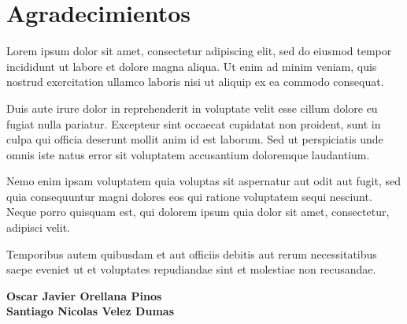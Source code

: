 
\chapter*{Agradecimientos}

\vspace{2cm}

Lorem ipsum dolor sit amet, consectetur adipiscing elit, sed do eiusmod tempor incididunt ut labore et dolore magna aliqua. Ut enim ad minim veniam, quis nostrud exercitation ullamco laboris nisi ut aliquip ex ea commodo consequat.

Duis aute irure dolor in reprehenderit in voluptate velit esse cillum dolore eu fugiat nulla pariatur. Excepteur sint occaecat cupidatat non proident, sunt in culpa qui officia deserunt mollit anim id est laborum. Sed ut perspiciatis unde omnis iste natus error sit voluptatem accusantium doloremque laudantium.

Nemo enim ipsam voluptatem quia voluptas sit aspernatur aut odit aut fugit, sed quia consequuntur magni dolores eos qui ratione voluptatem sequi nesciunt. Neque porro quisquam est, qui dolorem ipsum quia dolor sit amet, consectetur, adipisci velit.

Temporibus autem quibusdam et aut officiis debitis aut rerum necessitatibus saepe eveniet ut et voluptates repudiandae sint et molestiae non recusandae.

\vspace{1.5cm}

\begin{flushright}
\textbf{Oscar Javier Orellana Pinos}\\
\textbf{Santiago Nicolas Velez Dumas}
\end{flushright}
